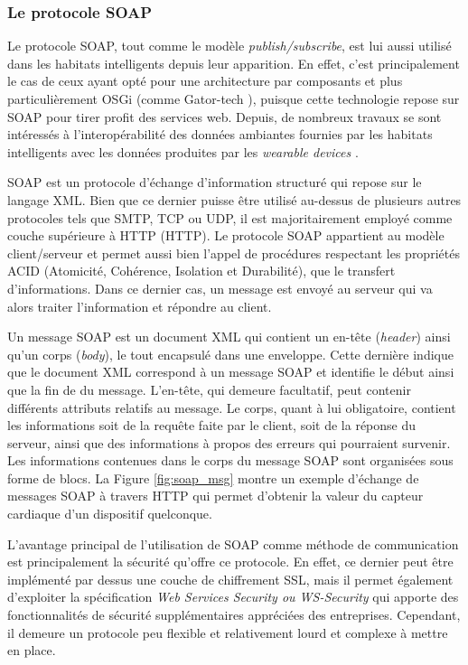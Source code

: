 \subsubsection{Le protocole \ac{SOAP}}

Le protocole \ac{SOAP}, tout comme le modèle \textit{publish/subscribe}, est lui aussi utilisé dans les habitats intelligents depuis leur apparition. En effet, c'est principalement le cas de ceux ayant opté pour une architecture par composants et plus particulièrement \ac{OSGi} (comme Gator-tech \citep{Helal2005}), puisque cette technologie repose sur \ac{SOAP} pour tirer profit des services web. Depuis, de nombreux travaux se sont intéressés à l'interopérabilité des données ambiantes fournies par les habitats intelligents avec les données produites par les \textit{wearable devices} \citep{Perumal2008, Cubo2014, Diaz-Rodriguez2018}.

\ac{SOAP} est un protocole d'échange d'information structuré qui repose sur le langage \ac{XML}. Bien que ce dernier puisse être utilisé au-dessus de plusieurs autres protocoles tels que \ac{SMTP}, \ac{TCP} ou \ac{UDP}, il est majoritairement employé comme couche supérieure à \acl{HTTP} (\acs{HTTP}). Le protocole \ac{SOAP} appartient au modèle client/serveur et permet aussi bien l'appel de procédures respectant les propriétés ACID (Atomicité, Cohérence, Isolation et Durabilité), que le transfert d'informations. Dans ce dernier cas, un message est envoyé au serveur qui va alors traiter l'information et répondre au client.

Un message \ac{SOAP} est un document \ac{XML} qui contient un en-tête (\textit{header}) ainsi qu'un corps (\textit{body}), le tout encapsulé dans une enveloppe. Cette dernière indique que le document XML correspond à un message \ac{SOAP} et identifie le début ainsi que la fin de du message. L'en-tête, qui demeure facultatif, peut contenir différents attributs relatifs au message. Le corps, quant à lui obligatoire, contient les informations soit de la requête faite par le client, soit de la réponse du serveur, ainsi que des informations à propos des erreurs qui pourraient survenir. Les informations contenues dans le corps du message \ac{SOAP} sont organisées sous forme de blocs. La Figure \ref{fig:soap_msg} montre un exemple d'échange de messages \ac{SOAP} à travers \ac{HTTP} qui permet d'obtenir la valeur du capteur cardiaque d'un dispositif quelconque.

L'avantage principal de l'utilisation de \ac{SOAP} comme méthode de communication est principalement la sécurité qu'offre ce protocole. En effet, ce dernier peut être implémenté par dessus une couche de chiffrement \ac{SSL}, mais il permet également d'exploiter la spécification \textit{Web Services Security ou WS-Security} qui apporte des fonctionnalités de sécurité supplémentaires appréciées des entreprises. Cependant, il demeure un protocole peu flexible et relativement lourd et complexe à mettre en place.

